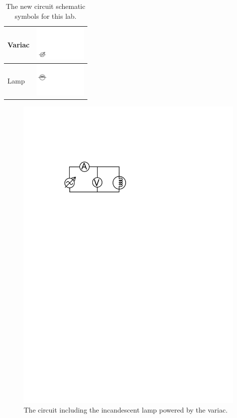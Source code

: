 \documentclass[12pt]{article}
\begin{document}
\begin{table}
  \centering
  \caption{The new circuit schematic symbols for this lab.}
  \begin{tabular}{|l|c|}\hline
    Variac & \includegraphics[width=1in]{figures/variac_schem}\\ \hline
    Lamp & \includegraphics[width=1in]{figures/lamp}\\ \hline
  \end{tabular}
  \label{tab:symbols}
\end{table}
\begin{figure}
  \centering
  \includegraphics[width=2\textwidth/3]{figures/circuit}
  \caption{The circuit including the incandescent lamp powered by the variac.}
  \label{fig:circuit}
\end{figure}
\end{document}
